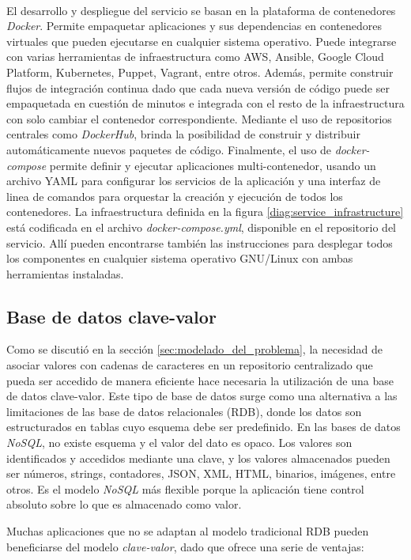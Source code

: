 \documentclass[a4paper,10pt, oneside]{article}
\begin{document}
\

El desarrollo y despliegue del servicio se basan en la plataforma de contenedores \textit{Docker}\cite{docker}. Permite empaquetar aplicaciones y sus dependencias en contenedores virtuales que pueden ejecutarse en cualquier sistema operativo. Puede integrarse con varias herramientas de infraestructura como AWS, Ansible, Google Cloud Platform, Kubernetes, Puppet, Vagrant, entre otros.
Además, permite construir flujos de integración continua dado que cada nueva versión de código puede ser empaquetada en cuestión de minutos e integrada con el resto de la infraestructura con solo cambiar el contenedor correspondiente. Mediante el uso de repositorios centrales como \textit{DockerHub}, brinda la posibilidad de construir y distribuir automáticamente nuevos paquetes de código.
Finalmente, el uso de \textit{docker-compose} permite definir y ejecutar aplicaciones multi-contenedor, usando un archivo YAML para configurar los servicios de la aplicación y una interfaz de linea de comandos para orquestar la creación y ejecución de todos los contenedores. La infraestructura definida en la figura \ref{diag:service_infrastructure} está codificada en el archivo \textit{docker-compose.yml}, disponible en el repositorio del servicio\cite{sketch-service}. Allí pueden encontrarse también las instrucciones para desplegar todos los componentes en cualquier sistema operativo GNU/Linux con ambas herramientas instaladas.


\subsection{Base de datos clave-valor}
Como se discutió en la sección \ref{sec:modelado_del_problema}, la necesidad de asociar valores con cadenas de caracteres en un repositorio centralizado que pueda ser accedido de manera eficiente hace necesaria la utilización de una base de datos clave-valor.
Este tipo de base de datos surge como una alternativa a las limitaciones de las base de datos relacionales (RDB), donde los datos son estructurados en tablas cuyo esquema debe ser predefinido. En las bases de datos \textit{NoSQL}, no existe esquema y el valor del dato es opaco. Los valores son identificados y accedidos mediante una clave, y los valores almacenados pueden ser números, strings, contadores, JSON, XML, HTML, binarios, imágenes, entre otros. Es el modelo \textit{NoSQL} más flexible porque la aplicación tiene control absoluto sobre lo que es almacenado como valor.

Muchas aplicaciones que no se adaptan al modelo tradicional RDB pueden beneficiarse del modelo \textit{clave-valor}, dado que ofrece una serie de ventajas:
\end{document}
